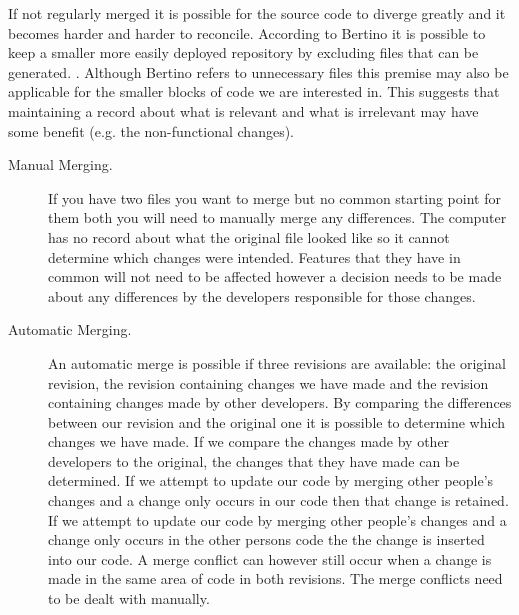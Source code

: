 If not regularly merged it is possible for the source code to diverge greatly and it becomes harder and harder to reconcile.
 According to Bertino it is possible to keep a smaller more easily deployed repository by excluding files that can be generated. \cite{Bertino2012}. Although Bertino refers to unnecessary files this premise may also be applicable for the smaller blocks of code we are interested in. This suggests that maintaining a record about what is relevant and what is irrelevant may have some benefit (e.g. the non-functional changes).
 
\begin{description}
  \item [Manual Merging.]
If you have two files you want to merge but no common starting point for them both you will need to manually merge any differences.
The computer has no record about what the original file looked like so it cannot determine which changes were intended.
Features that they have in common will not need to be affected however a decision needs to be made about any differences by the developers responsible for those changes.

  \item [Automatic Merging.] 
An automatic merge is possible if three revisions are available: the original revision, the revision containing changes we have made and the revision containing changes made by other developers. 
By comparing the differences between our revision and the original one it is possible to determine which changes we have made.  
If we compare the changes made by other developers to the original, the changes that they have made can be determined.  
If we attempt to update our code by merging other people's changes and a change only occurs in our code then that change is retained. 
If we attempt to update our code by merging other people's changes and a change only occurs in the other persons code the the change is inserted into our code.
A merge conflict can however still occur when a change is made in the same area of code in both revisions.
The merge conflicts need to be dealt with manually.


% 
\end{description}
 
